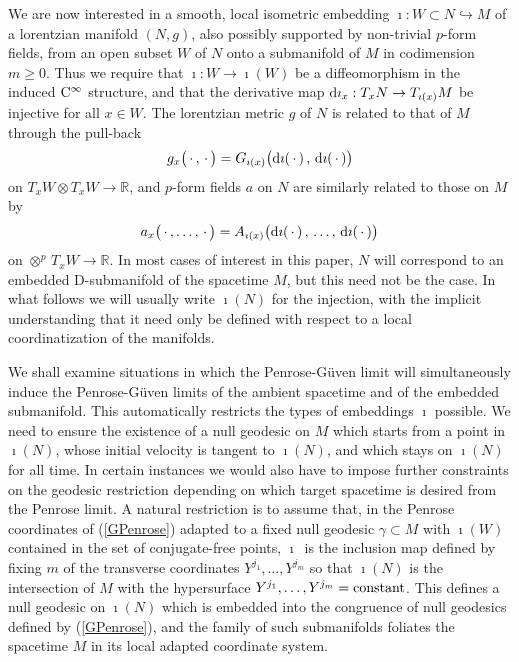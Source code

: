 \documentclass[11pt,a4paper]{article}
\def\dd{{\rm d}}
\newcommand{\real}{{\mathbb R}} %
\newcommand{\beq}{\begin{eqnarray}}
\newcommand{\eeq}{\end{eqnarray}}
\begin{document}
We are now interested in a smooth, local isometric embedding
$\imath:W\subset N\hookrightarrow M$ of a lorentzian manifold $(N,g)$, also
possibly supported by non-trivial $p$-form fields, from an open subset
$W$ of $N$ onto a submanifold of $M$ in codimension $m\geq0$. Thus we
require that $\imath:W\to\imath(W)$ be a diffeomorphism in the induced
${\rm C}^\infty$ structure, and that the derivative map $\dd\imath_x:T_xN\to
T_{\imath(x)}M$ be injective for all $x\in W$. The lorentzian metric
$g$ of $N$ is related to that of $M$ through the pull-back
\beq
g_x\bigl(\,\cdot\,,\,\cdot\,\bigr)=G_{\imath(x)}\bigl(\dd\imath(\,
\cdot\,)\,,\,\dd\imath(\,\cdot\,)\bigr)
\label{gNpullback}\eeq
on $T_xW\otimes T_xW\to\real$, and $p$-form fields $a$ on $N$ are similarly
related to those on $M$ by
\beq
a_x\bigl(\,\cdot\,,\ldots,\,\cdot\,\bigr)=A_{\imath(x)}
\bigl(\dd\imath(\,\cdot\,)\,,\,\ldots,\,\dd\imath(\,\cdot\,)\bigr)
\label{aNpullback}\eeq
on $\otimes^p\,T_xW\to\real$. In most cases of interest in this paper,
$N$ will correspond to
an embedded D-submanifold of the spacetime $M$, but this need not be
the case. In what follows we will usually write $\imath(N)$ for the
injection, with the implicit understanding that it need only be
defined with respect to a local coordinatization of the manifolds.

We shall examine situations in which the Penrose-G\"uven limit will
simultaneously induce the Penrose-G\"uven limits of the ambient spacetime and
of the embedded submanifold. This automatically restricts the types of
embeddings $\imath$ possible. We need to ensure the existence of a
null geodesic on $M$ which starts from a point in $\imath(N)$, whose
initial velocity is tangent to $\imath(N)$, and
which stays on $\imath(N)$ for all time. In certain instances we would
also have to impose further constraints on the geodesic restriction
depending on which target spacetime is desired from the Penrose
limit. A natural restriction is to assume that, in the Penrose
coordinates of (\ref{GPenrose}) adapted to a fixed null geodesic
$\gamma\subset M$ with $\imath(W)$ contained in the set of
conjugate-free points, $\imath$~is the inclusion map defined by fixing
$m$ of the transverse coordinates $Y^{j_1},\dots,Y^{j_m}$ so that
$\imath(N)$ is the intersection of $M$ with the
hypersurface $Y^{j_1},\dots,Y^{j_m}={\rm constant}$. This defines a
null geodesic on $\imath(N)$ which is embedded into the congruence
of null geodesics defined by (\ref{GPenrose}), and the family of such
submanifolds foliates the spacetime $M$ in its local adapted
coordinate system.
\end{document}

